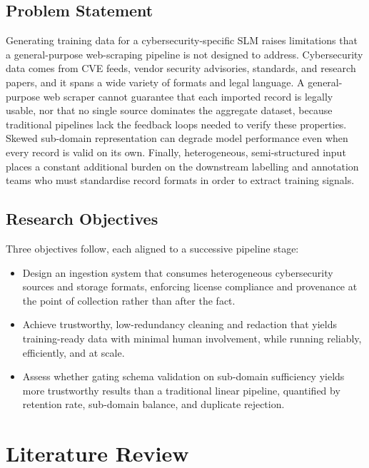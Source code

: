 \documentclass[conference]{IEEEtran}
\begin{document}
\subsection{Problem Statement}

Generating training data for a cybersecurity-specific SLM raises
limitations that a general-purpose web-scraping pipeline is not
designed to address. Cybersecurity data comes from CVE feeds,
vendor security advisories, standards, and research papers, and
it spans a wide variety of formats and legal language. A
general-purpose web scraper cannot guarantee that each imported
record is legally usable, nor that no single source dominates the
aggregate dataset, because traditional pipelines lack the
feedback loops needed to verify these properties. Skewed
sub-domain representation can degrade model performance even when
every record is valid on its own. Finally, heterogeneous,
semi-structured input places a constant additional burden on the
downstream labelling and annotation teams who must standardise
record formats in order to extract training signals.

\subsection{Research Objectives}

Three objectives follow, each aligned to a successive pipeline stage:
\begin{itemize}
\item Design an ingestion system that consumes heterogeneous cybersecurity sources and storage formats, enforcing license compliance and provenance at the point of collection rather than after the fact.
\item Achieve trustworthy, low-redundancy cleaning and redaction that yields training-ready data with minimal human involvement, while running reliably, efficiently, and at scale.
\item Assess whether gating schema validation on sub-domain
sufficiency yields more trustworthy results than a traditional linear pipeline, quantified by retention rate, sub-domain balance, and duplicate rejection.
\end{itemize}

\section{Literature Review}
\end{document}
